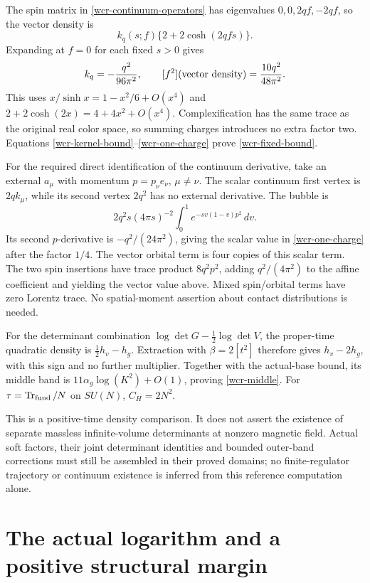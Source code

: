 \documentclass[11pt]{article}
\theoremstyle{remark}
\begin{document}
The spin matrix in \eqref{wcr-continuum-operators} has eigenvalues
\(0,0,2qf,-2qf\), so the vector density is
\[
 k_q(s;f)\{2+2\cosh(2qfs)\}.
\]
Expanding at \(f=0\) for each fixed \(s>0\) gives
\begin{equation}
 [f^2]k_q=-\frac{q^2}{96\pi^2},\qquad
 [f^2](\hbox{vector density})=\frac{10q^2}{48\pi^2}.
 \label{wcr-one-charge}
\end{equation}
This uses \(x/\sinh x=1-x^2/6+O(x^4)\) and
\(2+2\cosh(2x)=4+4x^2+O(x^4)\).
Complexification has the same trace as the original real color space,
so summing charges introduces no extra factor two.
Equations \eqref{wcr-kernel-bound}--\eqref{wcr-one-charge}
prove \eqref{wcr-fixed-bound}.

For the required direct identification of the continuum derivative,
take an external
\(a_\mu\) with momentum \(p=p_\nu e_\nu\), \(\mu\ne\nu\).
The scalar continuum first vertex is \(2qk_\mu\), while its second
vertex \(2q^2\) has no external derivative. The bubble is
\[
 2q^2s(4\pi s)^{-2}\int_0^1e^{-sv(1-v)p^2}\,dv.
\]
Its second \(p\)-derivative is \(-q^2/(24\pi^2)\), giving the scalar
value in \eqref{wcr-one-charge} after the factor \(1/4\).
The vector orbital term is four copies of this scalar term.
The two spin insertions have trace product \(8q^2p^2\), adding
\(q^2/(4\pi^2)\) to the affine coefficient and yielding the vector
value above. Mixed spin/orbital terms have zero Lorentz trace.
No spatial-moment assertion about contact distributions is needed.

For the determinant combination
\(\log\det G-\tfrac12\log\det V\), the proper-time quadratic density
is \(\tfrac12h_v-h_g\). Extraction with \(\beta=2[t^2]\) therefore
gives \(h_v-2h_g\), with this sign and no further multiplier.
Together with the actual-base bound, its middle band is
\(11\alpha_g\log(K^2)+O(1)\), proving \eqref{wcr-middle}.
For \(\tau=\operatorname{Tr}_{\rm fund}/N\) on \(SU(N)\),
\(C_H=2N^2\).

This is a positive-time density comparison. It does not assert the
existence of separate massless infinite-volume determinants at nonzero
magnetic field. Actual soft factors, their joint determinant identities
and bounded outer-band corrections must still be assembled in their
proved domains; no finite-regulator trajectory or continuum existence
is inferred from this reference computation alone.



\section{The actual logarithm and a positive structural margin}
\label{apb-section}
\end{document}
